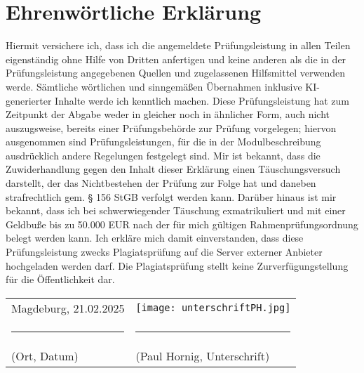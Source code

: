 \newpage
\section*{Ehrenwörtliche Erklärung}

Hiermit versichere ich, dass ich die angemeldete Prüfungsleistung in allen Teilen eigenständig ohne Hilfe von Dritten anfertigen und keine anderen als die in der Prüfungsleistung angegebenen Quellen und zugelassenen Hilfsmittel verwenden werde. Sämtliche wörtlichen und sinngemäßen Übernahmen inklusive KI-generierter Inhalte werde ich kenntlich machen.
Diese Prüfungsleistung hat zum Zeitpunkt der Abgabe weder in gleicher noch in ähnlicher Form, auch nicht auszugsweise, bereits einer Prüfungsbehörde zur Prüfung vorgelegen; hiervon ausgenommen sind Prüfungsleistungen, für die in der Modulbeschreibung ausdrücklich andere Regelungen festgelegt sind.
Mir ist bekannt, dass die Zuwiderhandlung gegen den Inhalt dieser Erklärung einen Täuschungsversuch darstellt, der das Nichtbestehen der Prüfung zur Folge hat und daneben strafrechtlich gem. § 156 StGB verfolgt werden kann. Darüber hinaus ist mir bekannt, dass ich bei schwerwiegender Täuschung exmatrikuliert und mit einer Geldbuße bis zu 50.000 EUR nach der für mich gültigen Rahmenprüfungsordnung belegt werden kann.
Ich erkläre mich damit einverstanden, dass diese Prüfungsleistung zwecks Plagiatsprüfung auf die Server externer Anbieter hochgeladen werden darf. Die Plagiatsprüfung stellt keine Zurverfügungstellung für die Öffentlichkeit dar.



\vspace{1cm}




\begin{tabular}{m{7cm} m{7cm}}
    \vspace{1.3cm}Magdeburg, 21.02.2025 & \vspace{0.1cm} \texttt{[image: unterschriftPH.jpg]} \\
    \multicolumn{1}{c}{\hspace{-2cm}\rule{5cm}{0.4pt}} & \multicolumn{1}{c}{\hspace{-2cm}\rule{5cm}{0.4pt}} \\
    (Ort, Datum) & (Paul Hornig, Unterschrift) \\
\end{tabular}

